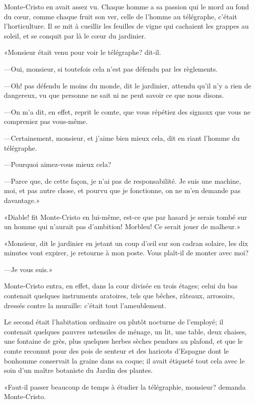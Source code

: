 Monte-Cristo en avait assez vu. Chaque homme a sa passion qui le mord au fond du cœur, comme chaque fruit son ver, celle de l'homme au télégraphe, c'était l'horticulture. Il se mit à cueillir les feuilles de vigne qui cachaient les grappes au soleil, et se conquit par là le cœur du jardinier. 

«Monsieur était venu pour voir le télégraphe? dit-il. 

—Oui, monsieur, si toutefois cela n'est pas défendu par les règlements. 

—Oh! pas défendu le moins du monde, dit le jardinier, attendu qu'il n'y a rien de dangereux, vu que personne ne sait ni ne peut savoir ce que nous disons. 

—On m'a dit, en effet, reprit le comte, que vous répétiez des signaux que vous ne compreniez pas vous-même. 

—Certainement, monsieur, et j'aime bien mieux cela, dit en riant l'homme du télégraphe. 

—Pourquoi aimez-vous mieux cela? 

—Parce que, de cette façon, je n'ai pas de responsabilité. Je suis une machine, moi, et pas autre chose, et pourvu que je fonctionne, on ne m'en demande pas davantage.»  

«Diable! fit Monte-Cristo en lui-même, est-ce que par hasard je serais tombé sur un homme qui n'aurait pas d'ambition! Morbleu! Ce serait jouer de malheur.» 

«Monsieur, dit le jardinier en jetant un coup d'œil sur son cadran solaire, les dix minutes vont expirer, je retourne à mon poste. Vous plaît-il de monter avec moi? 

—Je vous suis.» 

Monte-Cristo entra, en effet, dans la cour divisée en trois étages; celui du bas contenait quelques instruments aratoires, tels que bêches, râteaux, arrosoirs, dressés contre la muraille: c'était tout l'ameublement. 

Le second était l'habitation ordinaire ou plutôt nocturne de l'employé; il contenait quelques pauvres ustensiles de ménage, un lit, une table, deux chaises, une fontaine de grès, plus quelques herbes sèches pendues au plafond, et que le comte reconnut pour des pois de senteur et des haricots d'Espagne dont le bonhomme conservait la graine dans sa coque; il avait étiqueté tout cela avec le soin d'un maître botaniste du Jardin des plantes. 

«Faut-il passer beaucoup de temps à étudier la télégraphie, monsieur? demanda Monte-Cristo. 

